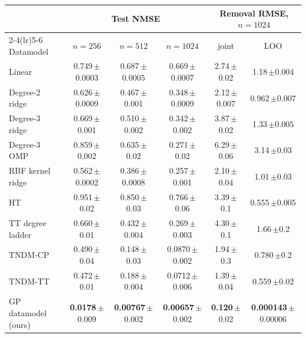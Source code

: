 \begin{tabular}{@{}lccccc@{}}
\toprule
& \multicolumn{3}{c}{Test NMSE} & \multicolumn{2}{c}{Removal RMSE, $n=1024$} \\
\cmidrule(lr){2-4}\cmidrule(lr){5-6}
Datamodel & $n=256$ & $n=512$ & $n=1024$ & joint & LOO \\
\midrule
Linear & 0.749\,{\scriptsize$\pm$0.0003} & 0.687\,{\scriptsize$\pm$0.0005} & 0.669\,{\scriptsize$\pm$0.0007} & 2.74\,{\scriptsize$\pm$0.02} & 1.18\,{\scriptsize$\pm$0.004} \\
Degree-2 ridge & 0.626\,{\scriptsize$\pm$0.0009} & 0.467\,{\scriptsize$\pm$0.001} & 0.348\,{\scriptsize$\pm$0.0009} & 2.12\,{\scriptsize$\pm$0.007} & 0.962\,{\scriptsize$\pm$0.007} \\
Degree-3 ridge & 0.669\,{\scriptsize$\pm$0.001} & 0.510\,{\scriptsize$\pm$0.002} & 0.342\,{\scriptsize$\pm$0.002} & 3.87\,{\scriptsize$\pm$0.02} & 1.33\,{\scriptsize$\pm$0.005} \\
Degree-3 OMP & 0.859\,{\scriptsize$\pm$0.002} & 0.635\,{\scriptsize$\pm$0.02} & 0.271\,{\scriptsize$\pm$0.02} & 6.29\,{\scriptsize$\pm$0.06} & 3.14\,{\scriptsize$\pm$0.03} \\
RBF kernel ridge & 0.562\,{\scriptsize$\pm$0.0002} & 0.386\,{\scriptsize$\pm$0.0008} & 0.257\,{\scriptsize$\pm$0.001} & 2.10\,{\scriptsize$\pm$0.04} & 1.01\,{\scriptsize$\pm$0.03} \\
HT & 0.951\,{\scriptsize$\pm$0.02} & 0.850\,{\scriptsize$\pm$0.03} & 0.766\,{\scriptsize$\pm$0.06} & 3.39\,{\scriptsize$\pm$0.1} & 0.555\,{\scriptsize$\pm$0.005} \\
TT degree ladder & 0.660\,{\scriptsize$\pm$0.01} & 0.432\,{\scriptsize$\pm$0.004} & 0.269\,{\scriptsize$\pm$0.003} & 4.30\,{\scriptsize$\pm$0.1} & 1.66\,{\scriptsize$\pm$0.2} \\
TNDM-CP & 0.490\,{\scriptsize$\pm$0.04} & 0.148\,{\scriptsize$\pm$0.03} & 0.0870\,{\scriptsize$\pm$0.002} & 1.94\,{\scriptsize$\pm$0.3} & 0.780\,{\scriptsize$\pm$0.2} \\
TNDM-TT & 0.472\,{\scriptsize$\pm$0.01} & 0.188\,{\scriptsize$\pm$0.004} & 0.0712\,{\scriptsize$\pm$0.006} & 1.39\,{\scriptsize$\pm$0.04} & 0.559\,{\scriptsize$\pm$0.02} \\
\midrule
GP datamodel (ours) & \textbf{0.0178}\,{\scriptsize$\pm$0.009} & \textbf{0.00767}\,{\scriptsize$\pm$0.002} & \textbf{0.00657}\,{\scriptsize$\pm$0.002} & \textbf{0.120}\,{\scriptsize$\pm$0.02} & \textbf{0.000143}\,{\scriptsize$\pm$0.00006} \\
\bottomrule
\end{tabular}

